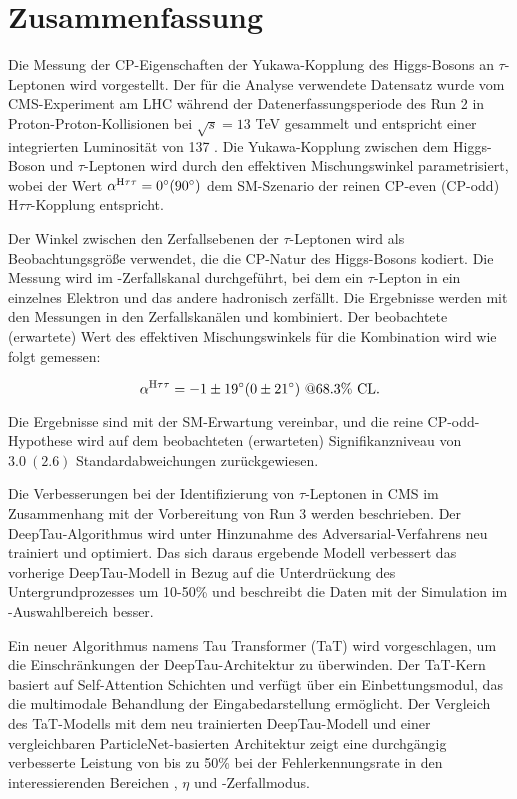 \thispagestyle{empty}
\vspace{-3cm}
\section*{\centering Zusammenfassung}
\noindent

Die Messung der CP-Eigenschaften der Yukawa-Kopplung des Higgs-Bosons an $\tau$-Leptonen wird vorgestellt. Der f\"ur die Analyse verwendete Datensatz wurde vom CMS-Experiment am LHC w\"ahrend der Datenerfassungsperiode des Run 2 in Proton-Proton-Kollisionen bei $\sqrt{s}=13$ TeV gesammelt und entspricht einer integrierten Luminosit\"at von 137 \ifb. Die Yukawa-Kopplung zwischen dem Higgs-Boson und $\tau$-Leptonen wird durch den effektiven Mischungswinkel \mixa parametrisiert, wobei der Wert $\alpha^{\text{H}\tau\tau} = 0^\circ (90^\circ)$ dem SM-Szenario der reinen CP-even (CP-odd) $\text{H}\tau\tau$-Kopplung entspricht. 

Der Winkel zwischen den Zerfallsebenen der $\tau$-Leptonen wird als Beobachtungsgr\"o{\ss}e verwendet, die die CP-Natur des Higgs-Bosons kodiert. Die Messung wird im \et-Zerfallskanal durchgef\"uhrt, bei dem ein $\tau$-Lepton in ein einzelnes Elektron und das andere hadronisch zerf\"allt. Die Ergebnisse werden mit den Messungen in den Zerfallskan\"alen \mt und \tata kombiniert. Der beobachtete (erwartete) Wert des effektiven Mischungswinkels f\"ur die Kombination wird wie folgt gemessen:

\begin{equation}
    \alpha^{\text{H}\tau\tau} = -1 \pm 19^\circ (0 \pm 21^\circ) ~@68.3\% \text{ CL}.
\end{equation}

Die Ergebnisse sind mit der SM-Erwartung vereinbar, und die reine CP-odd-Hypothese wird auf dem beobachteten (erwarteten) Signifikanzniveau von $3.0 ~(2.6)$ Standardabweichungen zur\"uckgewiesen.

Die Verbesserungen bei der Identifizierung von $\tau$-Leptonen in CMS im Zusammenhang mit der Vorbereitung von Run 3 werden beschrieben. Der DeepTau-Algorithmus wird unter Hinzunahme des Adversarial-Verfahrens neu trainiert und optimiert. Das sich daraus ergebende Modell verbessert das vorherige DeepTau-Modell in Bezug auf die Unterdr\"uckung des Untergrundprozesses um 10-50\% und beschreibt die Daten mit der Simulation im \htt-Auswahlbereich besser. 

Ein neuer Algorithmus namens Tau Transformer (TaT) wird vorgeschlagen, um die Einschr\"ankungen der DeepTau-Architektur zu \"uberwinden. Der TaT-Kern basiert auf Self-Attention Schichten und verf\"ugt \"uber ein Einbettungsmodul, das die multimodale Behandlung der Eingabedarstellung erm\"oglicht. Der Vergleich des TaT-Modells mit dem neu trainierten DeepTau-Modell und einer vergleichbaren ParticleNet-basierten Architektur zeigt eine durchg\"angig verbesserte Leistung von bis zu 50\% bei der Fehlerkennungsrate in den interessierenden Bereichen \pt, $\eta$ und \tauh-Zerfallmodus.   


